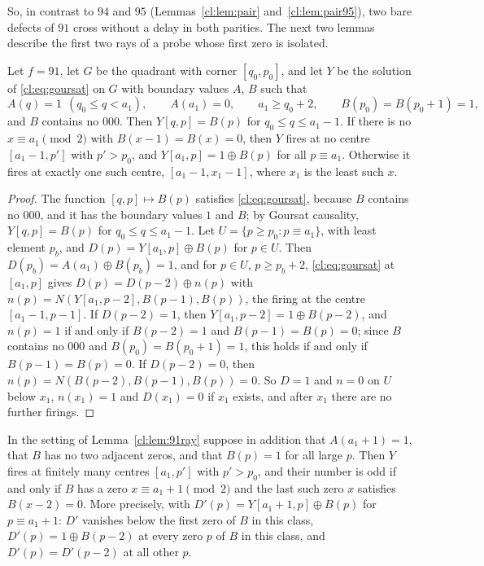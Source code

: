 So, in contrast to $94$ and $95$ (Lemmas~\ref{cl:lem:pair} and~\ref{cl:lem:pair95}), two bare defects of $91$ cross without a delay in both parities. The next two lemmas describe the first two rays of a probe whose first zero is isolated.

\begin{lemma}\label{cl:lem:91ray}
Let $f=91$, let $G$ be the quadrant with corner $[q_0,p_0]$, and let $Y$ be the solution of \eqref{cl:eq:goursat} on $G$ with boundary values $A$, $B$ such that
\[
A(q)=1\ \ (q_0\le q<a_1),\qquad A(a_1)=0,\qquad a_1\ge q_0+2,\qquad B(p_0)=B(p_0+1)=1,
\]
and $B$ contains no $000$. Then $Y[q,p]=B(p)$ for $q_0\le q\le a_1-1$. If there is no $x\equiv a_1\pmod2$ with $B(x-1)=B(x)=0$, then $Y$ fires at no centre $[a_1-1,p']$ with $p'>p_0$, and $Y[a_1,p]=1\oplus B(p)$ for all $p\equiv a_1$. Otherwise it fires at exactly one such centre, $[a_1-1,x_1-1]$, where $x_1$ is the least such $x$.
\end{lemma}

\begin{proof}
The function $[q,p]\mapsto B(p)$ satisfies \eqref{cl:eq:goursat}, because $B$ contains no $000$, and it has the boundary values $1$ and $B$; by Goursat causality, $Y[q,p]=B(p)$ for $q_0\le q\le a_1-1$. Let $U=\{p\ge p_0:p\equiv a_1\}$, with least element $p_b$, and $D(p)=Y[a_1,p]\oplus B(p)$ for $p\in U$. Then $D(p_b)=A(a_1)\oplus B(p_b)=1$, and for $p\in U$, $p\ge p_b+2$, \eqref{cl:eq:goursat} at $[a_1,p]$ gives $D(p)=D(p-2)\oplus n(p)$ with $n(p)=N(Y[a_1,p-2],B(p-1),B(p))$, the firing at the centre $[a_1-1,p-1]$. If $D(p-2)=1$, then $Y[a_1,p-2]=1\oplus B(p-2)$, and $n(p)=1$ if and only if $B(p-2)=1$ and $B(p-1)=B(p)=0$; since $B$ contains no $000$ and $B(p_0)=B(p_0+1)=1$, this holds if and only if $B(p-1)=B(p)=0$. If $D(p-2)=0$, then $n(p)=N(B(p-2),B(p-1),B(p))=0$. So $D=1$ and $n=0$ on $U$ below $x_1$, $n(x_1)=1$ and $D(x_1)=0$ if $x_1$ exists, and after $x_1$ there are no further firings.
\end{proof}

\begin{lemma}\label{cl:lem:91ray2}
In the setting of Lemma~\ref{cl:lem:91ray} suppose in addition that $A(a_1+1)=1$, that $B$ has no two adjacent zeros, and that $B(p)=1$ for all large $p$. Then $Y$ fires at finitely many centres $[a_1,p']$ with $p'>p_0$, and their number is odd if and only if $B$ has a zero $x\equiv a_1+1\pmod2$ and the last such zero $x$ satisfies $B(x-2)=0$. More precisely, with $D'(p)=Y[a_1+1,p]\oplus B(p)$ for $p\equiv a_1+1$: $D'$ vanishes below the first zero of $B$ in this class, $D'(p)=1\oplus B(p-2)$ at every zero $p$ of $B$ in this class, and $D'(p)=D'(p-2)$ at all other $p$.
\end{lemma}

